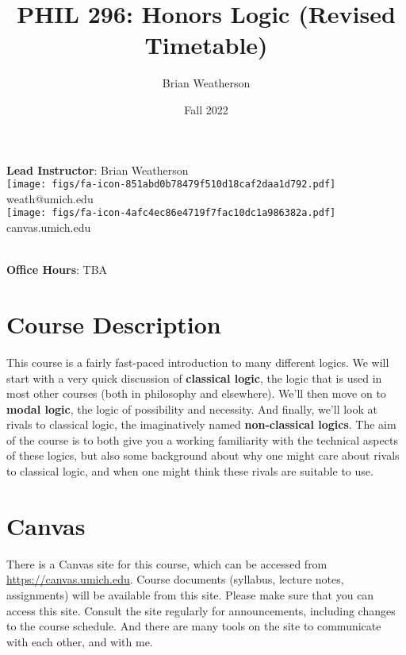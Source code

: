\documentclass[
]{article}
\title{PHIL 296: Honors Logic (Revised Timetable)}
\author{Brian Weatherson}
\date{Fall 2022}
\begin{document}
\maketitle
\ifdefined\Shaded\renewenvironment{Shaded}{\begin{tcolorbox}[boxrule=0pt, sharp corners, breakable, frame hidden, interior hidden, borderline west={3pt}{0pt}{shadecolor}, enhanced]}{\end{tcolorbox}}\fi

\textbf{Lead Instructor}: Brian Weatherson\\
\texttt{[image: figs/fa-icon-851abd0b78479f510d18caf2daa1d792.pdf]}
weath@umich.edu\\
\texttt{[image: figs/fa-icon-4afc4ec86e4719f7fac10dc1a986382a.pdf]}
canvas.umich.edu\\
\strut \\
\textbf{Office Hours}: TBA\\

\hypertarget{course-description}{%
\section{Course Description}\label{course-description}}

This course is a fairly fast-paced introduction to many different
logics. We will start with a very quick discussion of \textbf{classical
logic}, the logic that is used in most other courses (both in philosophy
and elsewhere). We'll then move on to \textbf{modal logic}, the logic of
possibility and necessity. And finally, we'll look at rivals to
classical logic, the imaginatively named \textbf{non-classical logics}.
The aim of the course is to both give you a working familiarity with the
technical aspects of these logics, but also some background about why
one might care about rivals to classical logic, and when one might think
these rivals are suitable to use.

\hypertarget{canvas}{%
\section{Canvas}\label{canvas}}

There is a Canvas site for this course, which can be accessed from
\url{https://canvas.umich.edu}. Course documents (syllabus, lecture
notes, assignments) will be available from this site. Please make sure
that you can access this site. Consult the site regularly for
announcements, including changes to the course schedule. And there are
many tools on the site to communicate with each other, and with me.
\end{document}

